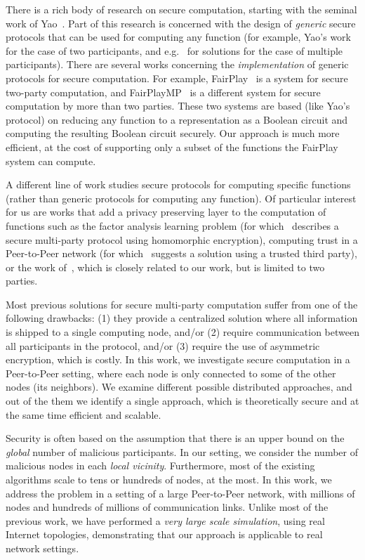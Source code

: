 \documentclass[10pt]{svjour3}
\begin{document}
There is a rich body of research on secure computation, starting
with the seminal work of Yao~\cite{Yao}. Part of this research is
concerned with the design of {\em generic} secure protocols that
can be used for computing any function (for example, Yao's
work~\cite{Yao} for the case of two participants, and
e.g.~\cite{BGW,GMW} for solutions for the case of multiple
participants).  There are several works concerning the {\em
implementation} of generic protocols for secure computation. For
example, FairPlay~\cite{Fairplay} is a system for secure two-party
computation, and FairPlayMP~\cite{FairPlayMP} is a different
system for secure computation by more than two parties.  These two
systems are based (like Yao's protocol) on reducing any function
to a representation as a Boolean circuit and computing the
resulting Boolean circuit securely. Our approach is much more
efficient, at the cost of supporting only a subset of the
functions the FairPlay system can compute.

A different line of work studies secure protocols for computing
specific functions (rather than generic protocols for computing any
function). Of particular interest for us are works that add
a privacy preserving layer to the computation of functions such as the
factor analysis learning problem (for which~\cite{Canny} describes a
secure multi-party protocol using homomorphic encryption),
computing trust in a Peer-to-Peer network (for which~\cite{EigenTrust}
suggests a solution using a trusted third party), or the work
of~\cite{PP3}, which is closely related to our work, but is limited to
two parties.

Most  previous solutions for secure multi-party computation suffer
from one of the following drawbacks: (1) they provide a
centralized solution where all information is shipped to a single
computing node, and/or (2) require communication between all
participants in the protocol, and/or (3) require the use of asymmetric
encryption, which is costly. In this work, we investigate
 secure computation in a Peer-to-Peer setting, where each
node is only connected to some of the other nodes (its neighbors).
We examine different possible distributed approaches, and out of the them
we identify a single approach, which is theoretically
secure and at the same time efficient and scalable.

Security is often based on the assumption that there is an upper
bound on the {\em global} number of malicious participants. In our
setting, we consider the number of malicious nodes in each {\em
local vicinity}. Furthermore, most of the existing algorithms
scale to tens or hundreds of nodes, at the most. In this work, we address
the problem in a setting of a large Peer-to-Peer network, with
millions of nodes and hundreds of millions of communication links.
Unlike most of the previous work, we have performed a {\em very
large scale simulation}, using real Internet topologies, demonstrating that
our approach is applicable to real network settings.
\end{document}
